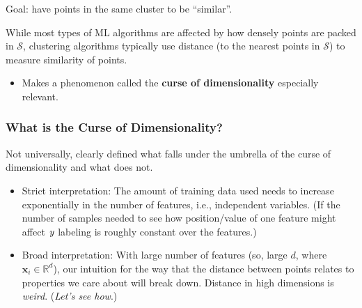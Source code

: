 \documentclass[smaller]{beamer}
\theoremstyle{example}
\newcommand{\x}{\textbf{x}}
\newcommand{\ix}[1]{{\it #1}}
\begin{document}
\begin{frame}
\begin{minipage}{\textwidth}
    \pause
    \vspace{8pt}
    Goal:
    have points in the same cluster to be ``similar''.

    \pause
    \vspace{8pt}
    While most types of ML algorithms are affected by how densely points are packed in $\mathcal S$, clustering algorithms typically use distance (to the nearest points in $\mathcal S$) to measure similarity of points. 
    \end{minipage}

    \pause
    \begin{itemize}
        \item Makes a phenomenon called the \textbf{curse of dimensionality} especially relevant.
    \end{itemize}  

\end{frame}

\begin{frame}
    \frametitle{What is the Curse of Dimensionality?}
    Not universally, clearly defined what falls under the umbrella of the curse of dimensionality and what does not. 
    \pause
    \begin{itemize}
        \item Strict interpretation: The amount of training data used needs to increase exponentially in the number of features, i.e., independent variables. (If the number of samples needed to see how position/value of one feature might affect $\ix y$ labeling is roughly constant over the features.)
        \pause
        \item Broad interpretation: With large number of features (so, large $d$, where $\x_i\in\mathbb R^d$), our intuition for the way that the distance between points relates to properties we care about will break down.\newline 
        Distance in high dimensions is \textit{weird}. (\textit{Let's see how}.)
    \end{itemize}
\end{frame}
\end{document}
